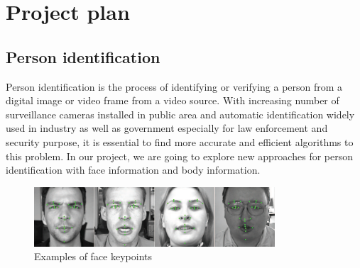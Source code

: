 \documentclass[pdftex,12pt,a4paper]{report}
\begin{document}
\hypersetup{
     colorlinks=true,
     linkcolor=black, 
     citecolor=red
}
\tableofcontents


\hypersetup{
     colorlinks=true,
     linkcolor=red, 
     citecolor=red
}
\chapter*{Project plan}
\section{Person identification}
Person identification is the process of identifying or verifying a person from 
a digital image or video frame from a video source. With increasing number of
surveillance cameras installed in public area and automatic identification
widely used in industry as well as government especially for law enforcement and
security purpose, it is essential to find more accurate and efficient
algorithms to this problem. In our project, we are going to explore new 
approaches for person identification with face information and body information.


\begin{figure}[b]
    \begin{center}
        \includegraphics[width=0.8\textwidth]{./res/facekeypoint}
    \end{center}
    \caption{Examples of face keypoints}
    \label{fig:facekeypoint}
\end{figure}
\end{document}
